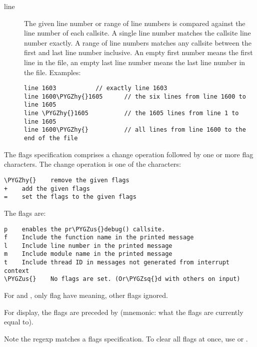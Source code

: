 \documentclass[a4paper,8pt,english]{sphinxmanual}
\def\PYGZus{\char`\_}
\def\PYGZhy{\char`\-}
\def\PYGZsq{\char`\'}
\renewcommand\PYGZsq{\textquotesingle}
\begin{document}
\begin{description}
\item[{line}] \leavevmode
The given line number or range of line numbers is compared
against the line number of each  callsite.  A single
line number matches the callsite line number exactly.  A
range of line numbers matches any callsite between the first
and last line number inclusive.  An empty first number means
the first line in the file, an empty last line number means the
last line number in the file.  Examples:

\begin{Verbatim}[commandchars=\\\{\}]
line 1603           // exactly line 1603
line 1600\PYGZhy{}1605      // the six lines from line 1600 to line 1605
line \PYGZhy{}1605          // the 1605 lines from line 1 to line 1605
line 1600\PYGZhy{}          // all lines from line 1600 to the end of the file
\end{Verbatim}

\end{description}

The flags specification comprises a change operation followed
by one or more flag characters.  The change operation is one
of the characters:

\begin{Verbatim}[commandchars=\\\{\}]
\PYGZhy{}    remove the given flags
+    add the given flags
=    set the flags to the given flags
\end{Verbatim}

The flags are:

\begin{Verbatim}[commandchars=\\\{\}]
p    enables the pr\PYGZus{}debug() callsite.
f    Include the function name in the printed message
l    Include line number in the printed message
m    Include module name in the printed message
t    Include thread ID in messages not generated from interrupt context
\PYGZus{}    No flags are set. (Or\PYGZsq{}d with others on input)
\end{Verbatim}

For  and , only  flag
have meaning, other flags ignored.

For display, the flags are preceded by \code{=}
(mnemonic: what the flags are currently equal to).

Note the regexp \code{\textasciicircum{}{[}-+={]}{[}flmpt\_{]}+\$} matches a flags specification.
To clear all flags at once, use \code{=\_} or .
\end{document}
